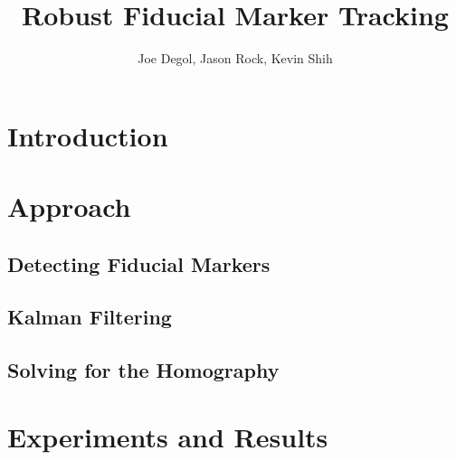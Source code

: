 \documentclass[12pt]{article}
\title{Robust Fiducial Marker Tracking}
\author{Joe Degol, Jason Rock, Kevin Shih}
\begin{document}
\maketitle

\section{Introduction}

\section{Approach}

\subsection{Detecting Fiducial Markers}

\subsection{Kalman Filtering}

\subsection{Solving for the Homography}

\section{Experiments and Results}
\end{document}
